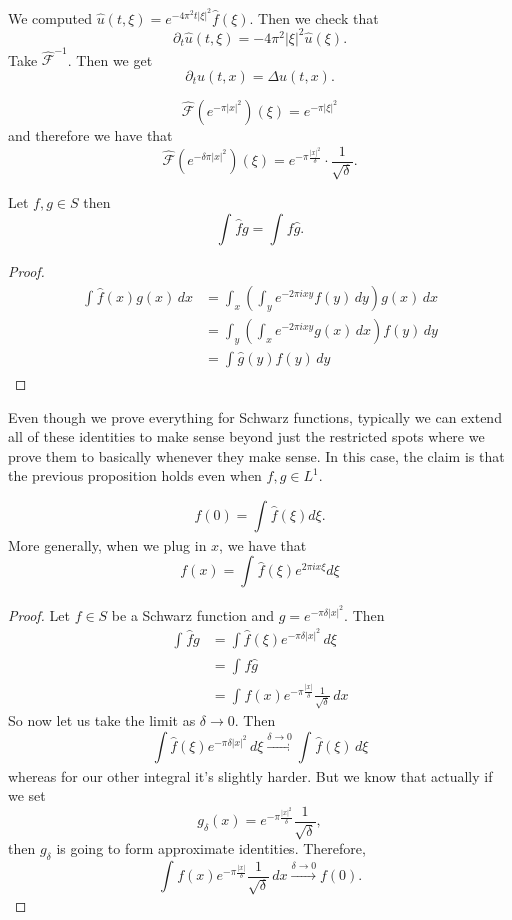 We computed \( \hat u(t, \xi) = e^{-4 \pi^{2} t | \xi|^{2}}\hat f( \xi) \). Then we check that
\[ \partial_{t} \hat u(t, \xi) = - 4 \pi^{2} | \xi|^{2} \hat u( \xi). \]
Take \( \hat {\mathcal{F}}^{-1} \). Then we get
\[ \partial_{t} u(t, x) = \Delta u(t, x). \]

\begin{lemma}
	\[ \hat {\mathcal{F}} \left( e^{- \pi |x|^{2}} \right)( \xi) = e^{- \pi | \xi|^{2}} \]
	and therefore we have that
	\[ \hat {\mathcal{F}} \left( e^{- \delta \pi |x|^{2}} \right) ( \xi) = e^{- \pi \frac{|x|^{2}}{\delta}} \cdot \frac{1}{\sqrt{\delta}}. \]
\end{lemma}

\begin{proposition}
	Let \( f, g \in S \) then
	\[ \int_{} \hat f g = \int_{} f \hat g. \]
\end{proposition}
\begin{proof}
	\begin{align*}
		\int_{} \hat f(x) g(x) \, dx &= \int_{x} \left( \int_{y} e^{-2 \pi i x y}f(y) \, dy \right)g(x) \, dx \\
		\tag{Fubini}																 &= \int_{y} \left( \int_{x} e^{-2 \pi i x y}g(x) \, dx \right)f(y) \, dy \\
																								 &= \int_{} \hat g(y) f(y) \, dy
	\end{align*}
\end{proof}

\begin{remark}
	Even though we prove everything for Schwarz functions, typically we can extend all of these identities to make sense beyond just the restricted spots where we prove them to basically whenever they make sense. In this case, the claim is that the previous proposition holds even when \( f, g \in L^{1} \).
\end{remark}

\begin{proposition}
	\[ f(0) = \int_{} \hat f( \xi) d \xi. \]
	More generally, when we plug in \( x \), we have that
	\[ f(x) = \int_{} \hat f(\xi) e^{2 \pi i x \xi} d \xi\]
\end{proposition}
\begin{proof}
	Let \( f \in S \) be a Schwarz function and \( g = e^{- \pi \delta |x|^{2}} \). Then
	\begin{align*} 
		\int_{} \hat f g &= \int \hat f(\xi) e^{- \pi \delta |x|^{2}} \, d \xi \\
										 &= \int_{} f \hat g\\
										 &= \int_{} f(x) e^{- \pi \frac{|x|}{\delta}} \frac{1}{\sqrt{\delta}} \, dx
	\end{align*}
	So now let us take the limit as \( \delta \to 0 \). Then
	\[ \int \hat f(\xi) e^{- \pi \delta |x|^{2}} \, d \xi \xrightarrow{\delta \to 0} \int_{} \hat f(\xi) \, d \xi \]
	whereas for our other integral it's slightly harder. But we know that actually if we set
	\[ g_{\delta}(x) = e^{- \pi \frac{|x|^{2}}{\delta}} \frac{1}{\sqrt{\delta}}, \]
	then \( g_{\delta} \) is going to form approximate identities. Therefore,
	\[
		\int_{} f(x) e^{- \pi \frac{|x|}{\delta}} \frac{1}{\sqrt{\delta}} \, dx \xrightarrow{\delta \to 0} f(0).
	\]
	
\end{proof}
